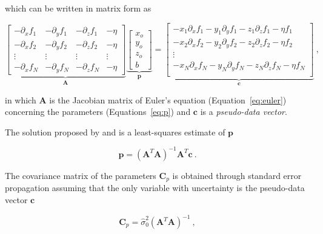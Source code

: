 \noindent
which can be written in matrix form as

\begin{equation}
  \underbrace{
    \begin{bmatrix}
      -\partial_x f_1 & -\partial_y f_1 & -\partial_z f_1 & -\eta \\
      -\partial_x f_2 & -\partial_y f_2 & -\partial_z f_2 & -\eta \\
      \vdots & \vdots & \vdots & \vdots \\
      -\partial_x f_N & -\partial_y f_N & -\partial_z f_N & -\eta
    \end{bmatrix}
  }_{\mathbf{A}}
  \underbrace{
    \begin{bmatrix}
      x_o \\ y_o \\ z_o \\ b
    \end{bmatrix}
  }_{\mathbf{p}}
  =
  \underbrace{
    \begin{bmatrix}
      -x_1\partial_x f_1 - y_1\partial_y f_1 - z_1\partial_z f_1 - \eta f_1 \\
      -x_2\partial_x f_2 - y_2\partial_y f_2 - z_2\partial_z f_2 - \eta f_2 \\
      \vdots \\
      -x_N\partial_x f_N - y_N\partial_y f_N - z_N\partial_z f_N - \eta f_N \\
    \end{bmatrix}
  }_{\mathbf{c}}
  \ ,
  \label{eq:deconv-system}
\end{equation}

\noindent
in which $\mathbf{A}$ is the Jacobian matrix of Euler's equation
(Equation~\ref{eq:euler}) concerning the parameters
(Equations~\ref{eq:p})
and $\mathbf{c}$ is a \textit{pseudo-data vector}.

The solution proposed by \citet{Thompson1982} and \citet{Reid1990} is a
least-squares estimate of $\mathbf{p}$

\begin{equation}
  \mathbf{p} = \left(\mathbf{A}^T\mathbf{A}\right)^{-1}
  \mathbf{A}^T\mathbf{c}
  \ .
  \label{eq:deconv-p}
\end{equation}

\noindent
The covariance matrix of the parameters $\mathbf{C}_p$ is obtained through
standard error propagation assuming that the only variable with uncertainty
is the pseudo-data vector $\mathbf{c}$

\begin{equation}
  \mathbf{C}_p = \hat{\sigma}_0^2 \left(\mathbf{A}^T\mathbf{A}\right)^{-1}
  \ ,
  \label{eq:deconv-cov}
\end{equation}

